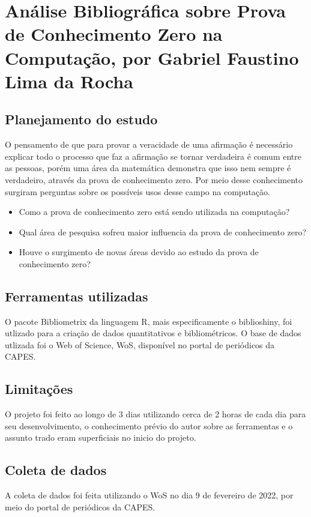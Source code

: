 \chapter{Análise Bibliográfica sobre Prova de Conhecimento Zero na Computação, por Gabriel Faustino Lima da Rocha}

\section{Planejamento do estudo}
O pensamento de que para provar a veracidade de uma afirmação é necessário explicar todo o processo que faz a afirmação se tornar verdadeira é comum entre as pessoas, porém uma área da matemática demonstra que isso nem sempre é verdadeiro, através da prova de conhecimento zero.
Por meio desse conhecimento surgiram perguntas sobre os possíveis usos desse campo na computação.

\begin{itemize}
    \item Como a prova de conhecimento zero está sendo utilizada na computação? 
    \item Qual área de pesquisa sofreu maior influencia da prova de conhecimento zero? 
    \item Houve o surgimento de novas áreas devido ao estudo da prova de conhecimento zero?
\end{itemize}


\section{Ferramentas utilizadas}
O pacote Bibliometrix da linguagem R, mais especificamente o biblioshiny, foi utlizado para a criação de dados quantitativos e bibliométricos. O base de dados utlizada foi o Web of Science, WoS, disponível no portal de periódicos da CAPES.

\section{Limitações}
O projeto foi feito ao longo de 3 dias utilizando cerca de 2 horas de cada dia para seu desenvolvimento, o conhecimento prévio do autor sobre as ferramentas e o assunto trado eram superficiais no inicio do projeto.

\section{Coleta de dados}
A coleta de dados foi feita utilizando o WoS no dia 9 de  fevereiro de 2022, por meio do portal de periódicos da CAPES.

